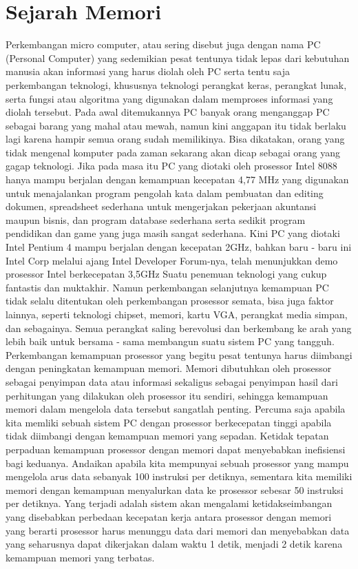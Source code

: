 \section{Sejarah Memori}
Perkembangan micro computer, atau sering disebut juga dengan nama PC (Personal Computer) yang sedemikian pesat tentunya tidak lepas dari kebutuhan manusia akan informasi yang harus diolah oleh PC serta tentu saja perkembangan teknologi, khususnya teknologi perangkat keras, perangkat lunak, serta fungsi atau algoritma yang digunakan dalam memproses informasi yang diolah tersebut.
Pada awal ditemukannya PC banyak orang menganggap PC sebagai barang yang mahal atau mewah, namun kini anggapan itu tidak berlaku lagi karena hampir semua orang sudah memilikinya. Bisa dikatakan, orang yang tidak mengenal komputer pada zaman sekarang akan dicap sebagai orang yang gagap teknologi. Jika pada masa itu PC yang diotaki oleh prosessor Intel 8088 hanya mampu berjalan dengan kemampuan kecepatan 4,77 MHz yang digunakan untuk menajalankan program pengolah kata dalam pembuatan dan editing dokumen, spreadsheet sederhana untuk mengerjakan pekerjaan akuntansi maupun bisnis, dan program database sederhana serta sedikit program pendidikan dan game yang juga masih sangat sederhana. Kini PC yang diotaki Intel Pentium 4 mampu berjalan dengan kecepatan 2GHz, bahkan baru - baru ini Intel Corp melalui ajang Intel Developer Forum-nya, telah menunjukkan demo prosessor Intel berkecepatan 3,5GHz Suatu penemuan teknologi yang cukup fantastis dan muktakhir. Namun perkembangan selanjutnya kemampuan PC tidak selalu ditentukan oleh perkembangan prosessor semata, bisa juga faktor lainnya, seperti teknologi chipset, memori, kartu VGA, perangkat media simpan, dan sebagainya. Semua perangkat saling berevolusi dan berkembang ke arah yang lebih baik untuk bersama - sama membangun suatu sistem PC yang tangguh. Perkembangan kemampuan prosessor yang begitu pesat tentunya harus diimbangi dengan peningkatan kemampuan memori. Memori dibutuhkan oleh prosessor sebagai penyimpan data atau informasi sekaligus sebagai penyimpan hasil dari perhitungan yang dilakukan oleh prosessor itu sendiri, sehingga kemampuan memori dalam mengelola data tersebut sangatlah penting. Percuma saja apabila kita memliki sebuah sistem PC dengan prosessor berkecepatan tinggi apabila tidak diimbangi dengan kemampuan memori yang sepadan. Ketidak tepatan perpaduan kemampuan prosessor dengan memori dapat menyebabkan inefisiensi bagi keduanya. Andaikan apabila kita mempunyai sebuah prosessor yang mampu mengelola arus data sebanyak 100 instruksi per detiknya, sementara kita memiliki memori dengan kemampuan menyalurkan data ke prosessor sebesar 50 instruksi per detiknya. Yang terjadi adalah sistem akan mengalami ketidakseimbangan yang disebabkan perbedaan kecepatan kerja antara prosessor dengan memori yang berarti prosessor harus menunggu data dari memori dan menyebabkan data yang seharusnya dapat dikerjakan dalam waktu 1 detik, menjadi 2 detik karena kemampuan memori yang terbatas. 

